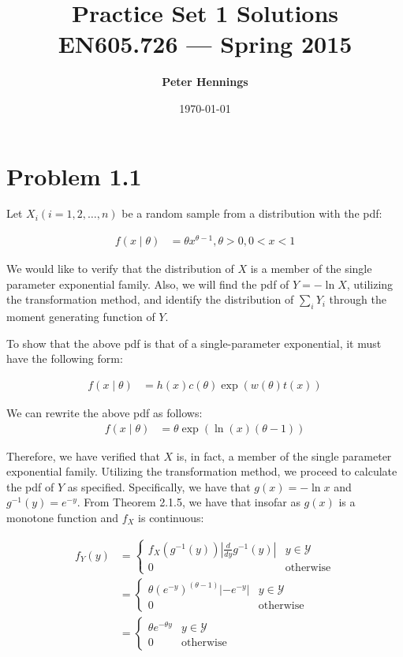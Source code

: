 \documentclass[11pt]{article}
\title{\bf Practice Set 1 Solutions\\[2ex] 
       \rm\normalsize EN605.726 --- Spring 2015}
\date{\today}
\author{\bf Peter Hennings}
\begin{document}
\maketitle

\section*{Problem 1.1} 

Let $X_i (i = 1,2,\dots,n)$ be a random sample from a distribution with the pdf:

\begin{align*}
  f(x \mid \theta) &= \theta x^{\theta-1}, \theta > 0, 0 < x < 1
\end{align*}

We would like to verify that the distribution of $X$ is a member of
the single parameter exponential family.  Also, we will find the pdf
of $Y = -\ln{X}$, utilizing the transformation method, and identify
the distribution of $\sum_i Y_i$ through the moment generating
function of $Y$.

To show that the above pdf is that of a single-parameter exponential,
it must have the following form:

\begin{align*}
  f(x \mid \theta) &= h(x)c(\theta) \exp{\left(  w(\theta) t(x) \right)}
\end{align*}

We can rewrite the above pdf as follows:
\begin{align*}
  f(x \mid \theta) &= \theta \exp{(\ln{(x)}(\theta-1))}
\end{align*}

Therefore, we have verified that $X$ is, in fact, a member of the
single parameter exponential family.  Utilizing the transformation
method, we proceed to calculate the pdf of $Y$ as specified.
Specifically, we have that $g(x) = -\ln{x}$ and $g^{-1}(y) = e^{-y}$.
From Theorem 2.1.5, we have that insofar as $g(x)$ is a monotone
function and $f_X$ is continuous:

\begin{align*}
  f_Y(y) &= 
           \begin{cases}
             f_X(g^{-1}(y)) \left| \frac{d}{dy} g^{-1}(y) \right| & y \in \mathcal{Y} \\
             0 & \text{otherwise}
           \end{cases} \\
  &= 
    \begin{cases}
      \theta (e^{-y})^{(\theta-1)} \left| -e^{-y} \right| & y \in \mathcal{Y} \\
      0 & \text{otherwise}
    \end{cases} \\
  &= 
    \begin{cases}
      \theta e^{-\theta y} & y \in \mathcal{Y} \\
      0 & \text{otherwise}
    \end{cases}
\end{align*}
\end{document}
